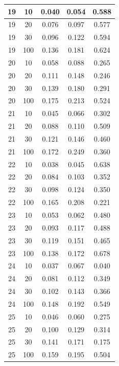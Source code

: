 \begin{longtable}{ |c|c|c|c|c| }
            19 & 10 & 0.040 & 0.054 & 0.588 \\ \hline
            19 & 20 & 0.076 & 0.097 & 0.577 \\ \hline
            19 & 30 & 0.096 & 0.122 & 0.594 \\ \hline
            19 & 100 & 0.136 & 0.181 & 0.624 \\ \hline
            20 & 10 & 0.058 & 0.088 & 0.265 \\ \hline
            20 & 20 & 0.111 & 0.148 & 0.246 \\ \hline
            20 & 30 & 0.139 & 0.180 & 0.291 \\ \hline
            20 & 100 & 0.175 & 0.213 & 0.524 \\ \hline
            21 & 10 & 0.045 & 0.066 & 0.302 \\ \hline
            21 & 20 & 0.088 & 0.110 & 0.509 \\ \hline
            21 & 30 & 0.121 & 0.146 & 0.460 \\ \hline
            21 & 100 & 0.172 & 0.249 & 0.360 \\ \hline
            22 & 10 & 0.038 & 0.045 & 0.638 \\ \hline
            22 & 20 & 0.084 & 0.103 & 0.352 \\ \hline
            22 & 30 & 0.098 & 0.124 & 0.350 \\ \hline
            22 & 100 & 0.165 & 0.208 & 0.221 \\ \hline
            23 & 10 & 0.053 & 0.062 & 0.480 \\ \hline
            23 & 20 & 0.093 & 0.117 & 0.488 \\ \hline
            23 & 30 & 0.119 & 0.151 & 0.465 \\ \hline
            23 & 100 & 0.138 & 0.172 & 0.678 \\ \hline
            24 & 10 & 0.037 & 0.067 & 0.040 \\ \hline
            24 & 20 & 0.081 & 0.112 & 0.349 \\ \hline
            24 & 30 & 0.102 & 0.143 & 0.366 \\ \hline
            24 & 100 & 0.148 & 0.192 & 0.549 \\ \hline
            25 & 10 & 0.046 & 0.060 & 0.275 \\ \hline
            25 & 20 & 0.100 & 0.129 & 0.314 \\ \hline
            25 & 30 & 0.141 & 0.171 & 0.175 \\ \hline
            25 & 100 & 0.159 & 0.195 & 0.504 \\ \hline

\end{longtable}
